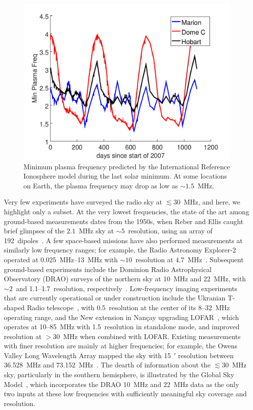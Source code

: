 \documentclass{ws-jai}
\begin{document}
\begin{figure}
  \begin{center}
    \includegraphics[width=0.6\linewidth]{Figures/marion_domec_hobart.png}
    \caption{Minimum plasma frequency predicted by the International
      Reference Ionosphere model during the last solar minimum.  At
      some locations on Earth, the plasma frequency may drop as low as
      $\sim1.5$~MHz.}
    \label{Fig:iri}
  \end{center}
\end{figure}

Very few experiments have surveyed the radio sky at $\lesssim 30$~MHz,
and here, we highlight only a subset.  At the very lowest frequencies,
the state of the art among ground-based measurements dates from the
1950s, when Reber and Ellis caught brief glimpses of the $2.1$~MHz sky
at $\sim 5$\degree\ resolution, using an array of
192~dipoles~\citep{1956JGR....61....1R}.  A few space-based missions
have also performed measurements at similarly low frequency ranges;
for example, the Radio Astronomy Explorer-2 operated at
\SIrange{0.025}{13}{\MHz} with $\sim 10$\degree\ resolution at
\SI{4.7}{\MHz}~\citep{1975A&A....40..365A}.  Subsequent ground-based
experiments include the Dominion Radio Astrophysical Observatory
(DRAO) surveys of the northern sky at 10~MHz and 22~MHz, with
$\sim2$\degree\ and 1.1--1.7\degree\ resolution,
respectively~\citep{1976MNRAS.177..601C, 1999A&AS..137....7R}.
Low-frequency imaging experiments that are currently operational or
under construction include the Ukranian T-shaped Radio
telescope~\citep{2016JAI.....541010Z}, with 0.5\degree\ resolution at
the center of its 8--32~MHz operating range, and the New extension in
Nan\c{c}ay upgrading LOFAR~\citep{7136773}, which operates at
10--85~MHz with 1.5\degree\ resolution in standalone mode, and
improved resolution at $>30$~MHz when combined with LOFAR.  Existing
measurements with finer resolution are mainly at higher frequencies;
for example, the Owens Valley Long Wavelength Array mapped the sky
with \SI{15}{\arcminute} resolution between 36.528~MHz and
73.152~MHz~\citep{2018AJ....156...32E}.  The dearth of information
about the $\lesssim 30$~MHz sky, particularly in the southern
hemisphere, is illustrated by the Global Sky
Model~\citep{2017MNRAS.464.3486Z}, which incorporates the DRAO 10~MHz
and 22~MHz data as the only two inputs at these low frequencies with
sufficiently meaningful sky coverage and resolution.
\end{document}
